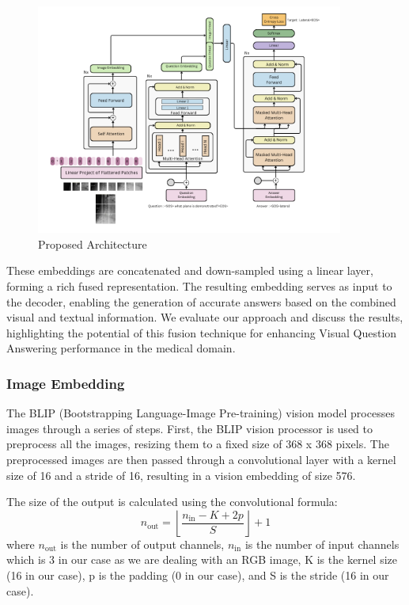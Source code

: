 \documentclass[pdflatex,sn-mathphys-num]{sn-jnl}%
\begin{document}
\begin{figure}[h]
\includegraphics[width=0.9\textwidth]{figs/proposed_architecture.png}
\caption{Proposed Architecture}
\centering
\end{figure}

These embeddings are concatenated and down-sampled using a linear layer, forming a rich fused representation. The resulting embedding serves as input to the decoder, enabling the generation of accurate answers based on the combined visual and textual information. We evaluate our approach and discuss the results, highlighting the potential of this fusion technique for enhancing Visual Question Answering performance in the medical domain.

\subsubsection{Image Embedding}\label{subsubsec3.4.1}

The BLIP (Bootstrapping Language-Image Pre-training) vision model processes images through a series of steps. First, the BLIP vision processor is used to preprocess all the images, resizing them to a fixed size of 368 x 368 pixels. The preprocessed images are then passed through a convolutional layer with a kernel size of 16 and a stride of 16, resulting in a vision embedding of size 576. 

The size of the output is calculated using the convolutional formula:
\begin{equation}
    n_{\mathrm{out}}=\left\lfloor\frac{n_{\mathrm{in}}-K+2p}{S}\right\rfloor+1
\end{equation}
where $n_{\mathrm{out}}$ is the number of output channels, $n_{\mathrm{in}}$ is the number of input channels which is 3 in our case as we are dealing with an RGB image, K is the kernel size (16 in our case), p is the padding (0 in our case), and S is the stride (16 in our case).
\end{document}
